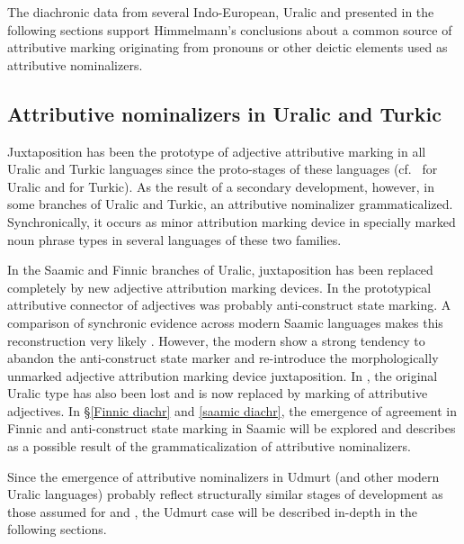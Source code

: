 The diachronic data from several Indo-European, Uralic and  presented in the following sections support Himmelmann's conclusions about a common source of attributive marking originating from pronouns or other deictic elements used as attributive nominalizers.

\subsection{Attributive nominalizers in Uralic and Turkic}\label{uralic-turkic diachr}
Juxtaposition has been the prototype of adjective attributive marking in all Uralic and Turkic languages since the proto-stages of these languages (cf.~\citealt[80–81]{decsy1990} for Uralic and \citealt[75–76]{decsy1998} for Turkic). As the result of a secondary development, however, in some branches of Uralic and Turkic, an attributive nominalizer grammaticalized. Synchronically, it occurs as minor attribution marking device in specially marked noun phrase types in several languages of these two families.%

In the Saamic and Finnic branches of Uralic, juxtaposition has been replaced completely by new adjective attribution marking devices. In  the prototypical attributive connector of adjectives was probably anti\hyp{}construct state marking. A comparison of synchronic evidence across modern Saamic languages makes this reconstruction very likely \citep{riesler2006b}. However, the modern  show a strong tendency to abandon the anti\hyp{}construct state marker and re-introduce the morphologically unmarked adjective attribution marking device juxtaposition. In , the original Uralic type has also been lost and is now replaced by  marking of attributive adjectives. In \S\ref{Finnic diachr} and \ref{saamic diachr}, the emergence of agreement in Finnic and anti\hyp{}construct state marking in Saamic will be explored and describes as a possible result of the grammaticalization of attributive nominalizers.

Since the emergence of attributive nominalizers in Udmurt (and other modern Uralic languages) probably reflect structurally similar stages of development as those assumed for  and , the Udmurt case will be described in-depth in the following sections.

